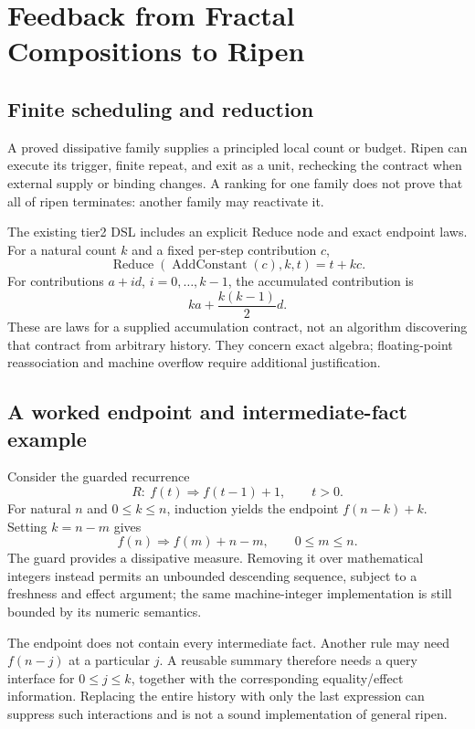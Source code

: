 \documentclass[11pt,a4paper]{article}
\begin{document}
\section{Feedback from Fractal Compositions to Ripen}
\subsection{Finite scheduling and reduction}
A proved dissipative family supplies a principled local count or budget. Ripen
can execute its trigger, finite repeat, and exit as a unit, rechecking the
contract when external supply or binding changes. A ranking for one family does
not prove that all of ripen terminates: another family may reactivate it.

The existing tier2 DSL includes an explicit Reduce node and exact endpoint laws.
For a natural count $k$ and a fixed per-step contribution $c$,
\begin{equation}
 \operatorname{Reduce}(\operatorname{AddConstant}(c),k,t)=t+kc.
\end{equation}
For contributions $a+id$, $i=0,\ldots,k-1$, the accumulated contribution is
\begin{equation}
 ka+\frac{k(k-1)}{2}d.
\end{equation}
These are laws for a supplied accumulation contract, not an algorithm discovering
that contract from arbitrary history. They concern exact algebra; floating-point
reassociation and machine overflow require additional justification.

\subsection{A worked endpoint and intermediate-fact example}
Consider the guarded recurrence
\begin{equation}
 R:\ f(t)\Rightarrow f(t-1)+1,\qquad t>0.
\end{equation}
For natural $n$ and $0\le k\le n$, induction yields the endpoint
$f(n-k)+k$. Setting $k=n-m$ gives
\begin{equation}
 f(n)\Rightarrow f(m)+n-m,\qquad 0\le m\le n.
\end{equation}
The guard provides a dissipative measure. Removing it over mathematical integers
instead permits an unbounded descending sequence, subject to a freshness and
effect argument; the same machine-integer implementation is still bounded by its
numeric semantics.

The endpoint does not contain every intermediate fact. Another rule may need
$f(n-j)$ at a particular $j$. A reusable summary therefore needs a query interface
for $0\le j\le k$, together with the corresponding equality/effect information.
Replacing the entire history with only the last expression can suppress such
interactions and is not a sound implementation of general ripen.
\end{document}
